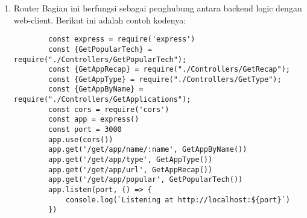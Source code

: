 \begin{enumerate}
\begin{lstlisting}
		async function getPopularTech(limit = 10, offset = 1) {
			const getAppSql = `select * from \`httparchive-bigquery-346414.numsite_app_result_count.numsite_app_result_count\` limit ${limit} offset ${offset} `
			
			const options = {
				query: getAppSql,
				location: 'US',
			};
			const [job] = await bigquery.createQueryJob(options);
			const [rows] = await job.getQueryResults();
			return rows;
		}
		
		module.exports = {getApplications, getApplicationsType, getApplicationsUrl, getPopularTech}
	\end{lstlisting}
	Berikut ini adalah penjelasan setiap fungsi:
	\begin{itemize}
		\item function getApplications(app = "Apache")\\
		Pada fungsi ini akan mengembalikan app, info, jumlah app, result. Pada fungsi terdapat parameter untuk menentukan app yang ingin ditampilkan. Data tidak akan menampilkan result yang UNVERSIONED dan NON CONCLUSIVE.
		
		\item function getApplicationType(limit = 5, offset = 1)\\
		Pada fungsi ini akan mengembalikan semua app. Pada fungsi ini terdapat parameter limit untuk membatasi data dan offset sebagai index data.
		
		\item function getApplicationsUrl(limit = 10, offset = 1)\\
		Pada fungsi ini akan mengembalikan semua isi tabel. Pada fungsi ini terdapat parameter limit untuk membatasi data dan offset sebagai index data.
		
		\item function getPopularTech(limit = 10, offset = 1)\\
		Pada fungsi ini akan mengembalikan semua isi tabel. Pada fungsi ini terdapat parameter limit untuk membatasi data dan offset sebagai index data.
		
	\end{itemize}

	\item Router
	Bagian ini berfungsi sebagai penghubung antara backend logic dengan web-client. Berikut ini adalah contoh kodenya:
	\begin{lstlisting}
		const express = require('express')
		const {GetPopularTech} = require("./Controllers/GetPopularTech");
		const {GetAppRecap} = require("./Controllers/GetRecap");
		const {GetAppType} = require("./Controllers/GetType");
		const {GetAppByName} = require("./Controllers/GetApplications");
		const cors = require('cors')
		const app = express()
		const port = 3000
		app.use(cors())
		app.get('/get/app/name/:name', GetAppByName())
		app.get('/get/app/type', GetAppType())
		app.get('/get/app/url', GetAppRecap())
		app.get('/get/app/popular', GetPopularTech())
		app.listen(port, () => {
			console.log(`Listening at http://localhost:${port}`)
		})
	\end{lstlisting}
	

\end{enumerate}
